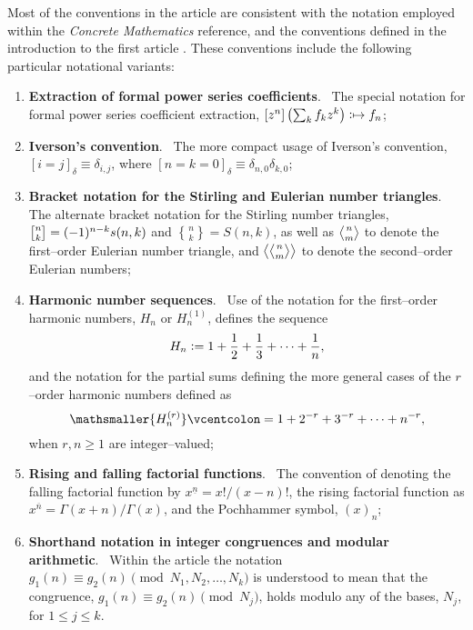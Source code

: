 \documentclass[12pt,reqno]{article}
\numberwithin{sfootnote}{section}
\numberwithin{equation}{section}
\renewcommand{\labelenumi}{\textbf{\arabic{enumi}.}}
\renewcommand{\labelenumi}{$\mathsmaller{\blacktriangleright}$ }
\theoremstyle{plain}
\theoremstyle{definition}
\theoremstyle{remark}
\newcommand{\defequals}{\ensuremath{\vcentcolon=}}
\newcommand{\defmapsto}{\ensuremath{\vcentcolon\mapsto}}
\newcommand{\gkpSI}[2]{\ensuremath{\genfrac{\lbrack}{\rbrack}{0pt}{}{#1}{#2}}}
\newcommand{\gkpSII}[2]{\ensuremath{\genfrac{\{}{\}}{0pt}{}{#1}{#2}}}
\newcommand{\gkpEI}[2]{\ensuremath{\genfrac{\langle}{\rangle}{0pt}{}{#1}{#2}}}
\newcommand{\gkpEII}[2]{\ensuremath{\left\langle\genfrac{\langle}{\rangle}{
            0pt}{}{#1}{#2}\right\rangle}}
\newcommand{\FFactII}[2]{\ensuremath{#1^{\underline{#2}}}}
\newcommand{\RFactII}[2]{\ensuremath{#1^{\overline{#2}}}}
\newcommand{\Pochhammer}[2]{\ensuremath{\left(#1\right)_{#2}}}
\newcommand{\Iverson}[1]{\ensuremath{\left[#1\right]_{\delta}}}
\begin{document}
Most of the conventions in the article are consistent with the 
notation employed within the \emph{Concrete Mathematics} reference, and 
the conventions defined in the introduction to the first article 
\citep{MULTIFACTJIS}. 
These conventions 
include the following particular notational variants: 
\begin{enumerate} 
     \renewcommand{\labelenumi}{$\mathsmaller{\blacktriangleright}$ } 
     \setlength{\itemsep}{-1mm} 
     \newcommand{\localitemlabel}[1]{\textbf{#1}.\ } 

\item \localitemlabel{Extraction of formal power series coefficients} 
The special notation for formal 
power series coefficient extraction, 
$[z^n] \left( \sum_{k} f_k z^k \right) \defmapsto f_n$; 

\item \localitemlabel{Iverson's convention} 
The more compact usage of Iverson's convention, 
$\Iverson{i = j} \equiv \delta_{i,j}$, where 
$\Iverson{n = k = 0} \equiv \delta_{n,0} \delta_{k,0}$; 

\item \localitemlabel{Bracket notation for the Stirling and 
                      Eulerian number triangles} 
The alternate bracket notation for the Stirling number triangles, 
$\gkpSI{n}{k} = (-1)^{n-k} s(n, k)$ and 
$\gkpSII{n}{k} = S(n, k)$, as well as 
$\gkpEI{n}{m}$ to denote the first--order Eulerian number triangle, and 
$\gkpEII{n}{m}$ to denote the second--order Eulerian numbers; 

\item \localitemlabel{Harmonic number sequences} 
Use of the notation for the first--order harmonic numbers, $H_n$ or 
$H_n^{(1)}$, defines the sequence 
\[
H_n \defequals 1+\frac{1}{2}+\frac{1}{3}+\cdots+\frac{1}{n}, 
\] 
and the notation for the partial sums defining the more general cases of the 
$r$--order harmonic numbers defined as 
\[ 
\mathsmaller{H_n^{(r)}} \defequals 1 + 2^{-r} + 3^{-r} + \cdots + n^{-r}, 
\]
when $r, n \geq 1$ are integer--valued; 

\item \localitemlabel{Rising and falling factorial functions} 
The convention of denoting the 
falling factorial function by $\FFactII{x}{n} = x! / (x-n)!$, the 
rising factorial function as $\RFactII{x}{n} = \Gamma(x+n) / \Gamma(x)$, 
and the Pochhammer symbol, $\Pochhammer{x}{n}$; 

\item \localitemlabel{Shorthand notation in integer congruences and modular arithmetic} 
Within the article the notation 
$g_1(n) \equiv g_2(n) \pmod{N_1, N_2, \ldots, N_k}$ is understood to 
mean that the congruence, $g_1(n) \equiv g_2(n) \pmod{N_j}$, holds 
modulo any of the bases, $N_j$, for $1 \leq j \leq k$. 

\end{enumerate} 
\end{document}
